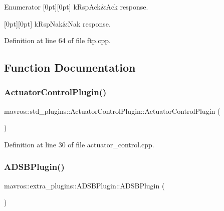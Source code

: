 \begin{DoxyEnumFields}{Enumerator}
[0pt][0pt]{}\mbox{\label{group__plugin_ggaa250490cd75da57eb00865e70210f672aa59cf34836fe912c24462f09bbaa29f3}} 
k\+Rsp\+Ack&Ack response. \\
\hline

[0pt][0pt]{}\mbox{\label{group__plugin_ggaa250490cd75da57eb00865e70210f672ab6594d2846e473df72ad8bd84907b980}} 
k\+Rsp\+Nak&Nak response. \\
\hline

\end{DoxyEnumFields}


Definition at line 64 of file ftp.\+cpp.



\subsection{Function Documentation}
\mbox{\label{group__plugin_gab65fc2cc66cc9797ed137a145fa98cb5}} 
\subsubsection{\texorpdfstring{ActuatorControlPlugin()}{ActuatorControlPlugin()}}
{\footnotesize\ttfamily mavros\+::std\+\_\+plugins\+::\+Actuator\+Control\+Plugin\+::\+Actuator\+Control\+Plugin (\begin{DoxyParamCaption}{ }\end{DoxyParamCaption})\hspace{0.3cm}{\ttfamily [inline]}}



Definition at line 30 of file actuator\+\_\+control.\+cpp.

\mbox{\label{group__plugin_ga1731629adbcab3ef7d49e6b838453c0c}} 
\subsubsection{\texorpdfstring{ADSBPlugin()}{ADSBPlugin()}}
{\footnotesize\ttfamily mavros\+::extra\+\_\+plugins\+::\+A\+D\+S\+B\+Plugin\+::\+A\+D\+S\+B\+Plugin (\begin{DoxyParamCaption}{ }\end{DoxyParamCaption})\hspace{0.3cm}{\ttfamily [inline]}}



